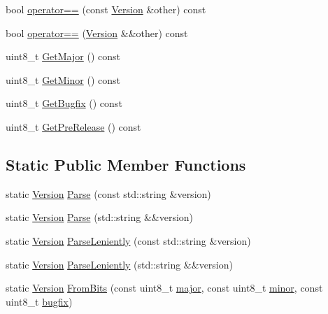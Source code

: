 \begin{DoxyCompactItemize}
\item 
bool \mbox{\hyperlink{classlucene_1_1core_1_1util_1_1etc_1_1Version_a63c25cead3e9426997ad1474f03ca714}{operator==}} (const \mbox{\hyperlink{classlucene_1_1core_1_1util_1_1etc_1_1Version}{Version}} \&other) const
\item 
bool \mbox{\hyperlink{classlucene_1_1core_1_1util_1_1etc_1_1Version_a3ed572af19e93da57d1fc70433bcd546}{operator==}} (\mbox{\hyperlink{classlucene_1_1core_1_1util_1_1etc_1_1Version}{Version}} \&\&other) const
\item 
uint8\+\_\+t \mbox{\hyperlink{classlucene_1_1core_1_1util_1_1etc_1_1Version_a60203ec5d575778dd789338fdc184892}{Get\+Major}} () const
\item 
uint8\+\_\+t \mbox{\hyperlink{classlucene_1_1core_1_1util_1_1etc_1_1Version_a6577fae444618b7cbc5307628c9d540d}{Get\+Minor}} () const
\item 
uint8\+\_\+t \mbox{\hyperlink{classlucene_1_1core_1_1util_1_1etc_1_1Version_af88de35853e26b854b57374f3d1d9293}{Get\+Bugfix}} () const
\item 
uint8\+\_\+t \mbox{\hyperlink{classlucene_1_1core_1_1util_1_1etc_1_1Version_ac878eb82ce5f3b3bdc4fd919a8091a82}{Get\+Pre\+Release}} () const
\end{DoxyCompactItemize}
\subsection*{Static Public Member Functions}
\begin{DoxyCompactItemize}
\item 
static \mbox{\hyperlink{classlucene_1_1core_1_1util_1_1etc_1_1Version}{Version}} \mbox{\hyperlink{classlucene_1_1core_1_1util_1_1etc_1_1Version_a10eba3883b2be5e104b3216260d8dc13}{Parse}} (const std\+::string \&version)
\item 
static \mbox{\hyperlink{classlucene_1_1core_1_1util_1_1etc_1_1Version}{Version}} \mbox{\hyperlink{classlucene_1_1core_1_1util_1_1etc_1_1Version_a3e659501f448ebbac238fe1b3180a9bd}{Parse}} (std\+::string \&\&version)
\item 
static \mbox{\hyperlink{classlucene_1_1core_1_1util_1_1etc_1_1Version}{Version}} \mbox{\hyperlink{classlucene_1_1core_1_1util_1_1etc_1_1Version_a75bcf3afe30558ee4030bc33f4a50919}{Parse\+Leniently}} (const std\+::string \&version)
\item 
static \mbox{\hyperlink{classlucene_1_1core_1_1util_1_1etc_1_1Version}{Version}} \mbox{\hyperlink{classlucene_1_1core_1_1util_1_1etc_1_1Version_afb83a6a64efd265dffa61c25ff6d5cba}{Parse\+Leniently}} (std\+::string \&\&version)
\item 
static \mbox{\hyperlink{classlucene_1_1core_1_1util_1_1etc_1_1Version}{Version}} \mbox{\hyperlink{classlucene_1_1core_1_1util_1_1etc_1_1Version_abe182afb477ee908c51a2bf3d484dbbd}{From\+Bits}} (const uint8\+\_\+t \mbox{\hyperlink{classlucene_1_1core_1_1util_1_1etc_1_1Version_a3dfe19c8cebead3a00ef2d62a7258a2f}{major}}, const uint8\+\_\+t \mbox{\hyperlink{classlucene_1_1core_1_1util_1_1etc_1_1Version_af2b0edc664bfbd88c3beeec7aaf1f5cd}{minor}}, const uint8\+\_\+t \mbox{\hyperlink{classlucene_1_1core_1_1util_1_1etc_1_1Version_ae15ce27ea5edc27bce7a15ec1ba725a4}{bugfix}})
\end{DoxyCompactItemize}
